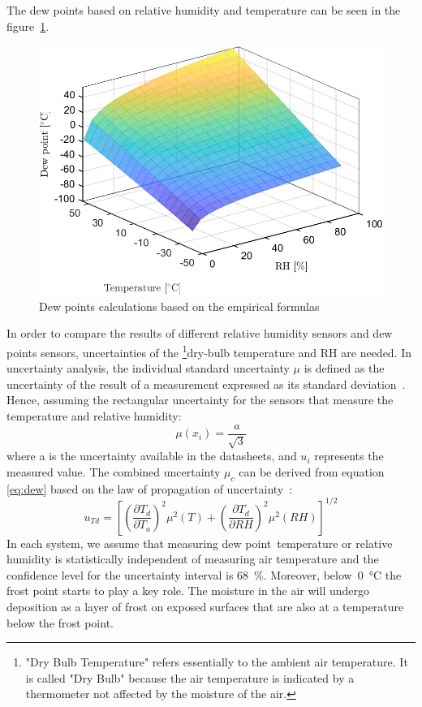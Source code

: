 The dew points based on relative humidity and temperature can be seen in the figure~\ref{fig:dewpointmagnus}.
\begin{figure}[!h]
\centering
\includegraphics[width=0.65\columnwidth]{Chapter5/images/dewpointmagnus.png}
\caption{Dew points calculations based on the empirical formulas}
\label{fig:dewpointmagnus}
\end{figure}
In order to compare the results of different relative humidity sensors and dew points sensors, uncertainties of the \footnote{"Dry Bulb Temperature" refers essentially to the ambient air temperature. It is called "Dry Bulb" because the air temperature is indicated by a thermometer not affected by the moisture of the air.}{dry-bulb} temperature and \gls{RH} are needed. In uncertainty analysis, the individual standard uncertainty $\mu$ is defined as the uncertainty of the result of a measurement expressed as its standard deviation~\cite{NIST_1994}. Hence, assuming the rectangular uncertainty for the sensors that measure the temperature and relative humidity:
\begin{equation}
    \mu(x_{i}) = \frac{a}{\sqrt{3}}
\end{equation}
where a is the uncertainty available in the datasheets, and $u_{i}$ represents the measured value. The combined uncertainty $\mu_{c}$ can be derived from equation \ref{eq:dew} based on the law of propagation of uncertainty~\cite{dp_uncertainty}:
\begin{equation}
    u_{Td} = \left [  \left (\frac{\partial T_{d}}{\partial T_{a}}  \right )^{2} \mu^{2}(T) + \left (\frac{\partial T_{d}}{\partial RH}  \right )^{2} \mu^{2}(RH)\right ]^{1/2}
    \label{dp_error}
\end{equation}
In each system, we assume that measuring dew point temperature or relative humidity is statistically independent of measuring air temperature and the confidence level for the uncertainty interval is 68~\%.  Moreover, below~\SI{0}{\celsius} the frost point starts to play a key role. The moisture in the air will undergo deposition as a layer of frost on exposed surfaces that are also at a temperature below the frost point. 


